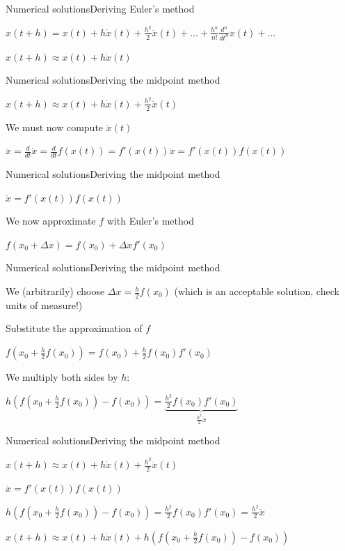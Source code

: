 \documentclass{beamer}
\begin{document}
\begin{slide}{Numerical solutions}{Deriving Euler's method}{
\item $x(t+h) = x(t) + h \dot x(t) + \frac{h^2}{2} \ddot x(t) + \dots + \frac{h^n}{n!} \frac{d^n}{dt^n}x(t) + \dots$
\item $x(t+h) \approx x(t) + h \dot x(t)$
}\end{slide}

\begin{slide}{Numerical solutions}{Deriving the midpoint method}{
\item $x(t+h) \approx x(t) + h \dot x(t) + \frac{h^2}{2} \ddot x(t)$
\pause
\item We must now compute $\ddot x(t)$
\item $\ddot x = \frac{d}{dt} \dot x = \frac{d}{dt} f(x(t)) = f'(x(t)) \dot x = f'(x(t)) f(x(t))$
}\end{slide}

\begin{slide}{Numerical solutions}{Deriving the midpoint method}{
\item $\ddot x = f'(x(t)) f(x(t))$
\item We now approximate $f$ with Euler's method
\item $f(x_0 + \Delta x) = f(x_0) + \Delta x f'(x_0)$
}\end{slide}

\begin{slide}{Numerical solutions}{Deriving the midpoint method}{
\item We (arbitrarily) choose $\Delta x = \frac{h}{2} f(x_0)$ (which is an acceptable solution, check units of measure!)
\item Substitute the approximation of $f$
\item $f(x_0 + \frac{h}{2} f(x_0)) = f(x_0) + \frac{h}{2} f(x_0) f'(x_0)$
\item We multiply both sides by $h$:
\item $h(f(x_0 + \frac{h}{2} f(x_0)) - f(x_0)) = \underbrace{\frac{h^2}{2} f(x_0) f'(x_0)}_{\frac{h^2}{2} \ddot x}$
}\end{slide}

\begin{slide}{Numerical solutions}{Deriving the midpoint method}{
\item $x(t+h) \approx x(t) + h \dot x(t) + \frac{h^2}{2} \ddot x(t)$
\item $\ddot x = f'(x(t)) f(x(t))$
\item $h(f(x_0 + \frac{h}{2} f(x_0)) - f(x_0)) = \frac{h^2}{2} f(x_0) f'(x_0) = \frac{h^2}{2} \ddot x$
\pause
\item $x(t+h) \approx x(t) + h \dot x(t) + h(f(x_0 + \frac{h}{2} f(x_0)) - f(x_0))$
}\end{slide}
\end{document}
